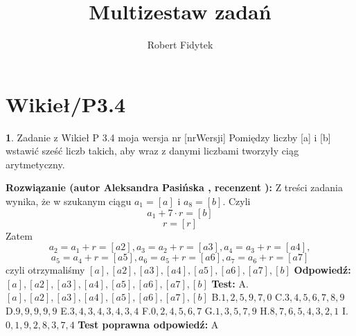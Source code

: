 \documentclass[12pt, a4paper]{article}
\title{Multizestaw zadań}
\author{Robert Fidytek}
\date{}
\theoremstyle{definition} %
\newtheorem{zad}{}
\newcommand{\kategoria}[1]{\section{#1}} %
\newcommand{\zadStart}[1]{\begin{zad}#1\newline} %
\newcommand{\zadStop}{\end{zad}}   %
\newcommand{\rozwStart}[2]{\noindent \textbf{Rozwiązanie (autor #1 , recenzent #2): }\newline} %
\newcommand{\rozwStop}{\newline}                                            %
\newcommand{\odpStart}{\noindent \textbf{Odpowiedź:}\newline}    %
\newcommand{\odpStop}{\newline}                                             %
\newcommand{\testStart}{\noindent \textbf{Test:}\newline} %
\newcommand{\testStop}{\newline} %
\newcommand{\kluczStart}{\noindent \textbf{Test poprawna odpowiedź:}\newline} %
\newcommand{\kluczStop}{\newline} %
\begin{document}
\maketitle


\kategoria{Wikieł/P3.4}
\zadStart{Zadanie z Wikieł P 3.4 moja wersja nr [nrWersji]}
Pomiędzy liczby [a] i [b] wstawić sześć liczb takich, aby wraz z danymi liczbami tworzyły ciąg arytmetyczny.
\zadStop
\rozwStart{Aleksandra Pasińska}{}
Z treści zadania wynika, że w szukanym ciągu $a_{1}=[a]$ i $a_{8}=[b]$. Czyli 
$$a_{1}+7\cdot r = [b]$$ 
$$r=[r]$$
Zatem
$$a_{2}=a_{1}+r=[a2], a_{3}=a_{2}+r=[a3], a_{4}=a_{3}+r=[a4],$$ $$ a_{5}=a_{4}+r=[a5], a_{6}=a_{5}+r=[a6], a_{7}=a_{6}+r=[a7]$$
czyli otrzymaliśmy $[a],[a2],[a3],[a4],[a5],[a6],[a7],[b]$
\rozwStop
\odpStart
$[a],[a2],[a3],[a4],[a5],[a6],[a7],[b]$
\odpStop
\testStart
A.$[a],[a2],[a3],[a4],[a5],[a6],[a7],[b]$
B.$1,2,5,9,7,0$
C.$3,4,5,6,7,8,9$
D.$9,9,9,9,9$
E.$3,4,3,4,3,4,3,4$
F.$0,2,4,5,6,7$
G.$1,3,5,7,9$
H.$8,7,6,5,4,3,2,1$
I.$0,1,9,2,8,3,7,4$
\testStop
\kluczStart
A
\kluczStop
\end{document}

